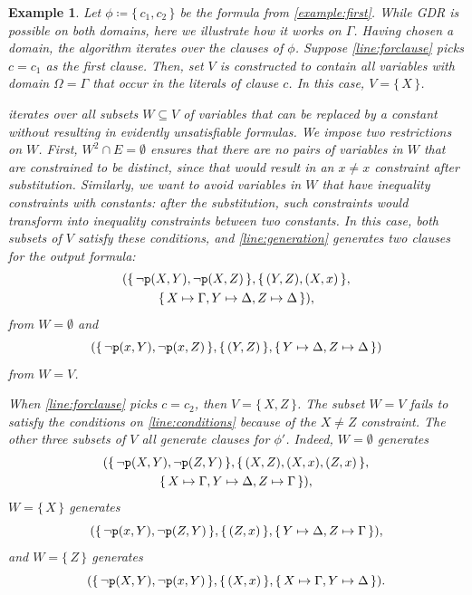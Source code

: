 \documentclass{article}
\newtheorem{example}{Example}
\newcommand{\predicate}{\texttt{\textup{p}}}
\begin{document}
\begin{example}
  Let $\phi \coloneqq \{\, c_1, c_2 \,\}$ be the formula from
  \cref{example:first}. While GDR is possible on both domains, here we
  illustrate how it works on $\Gamma$. Having chosen a domain, the algorithm
  iterates over the clauses of $\phi$. Suppose \cref{line:forclause} picks
  $c = c_1$ as the first clause. Then, set $V$ is constructed to contain all
  variables with domain $\Omega = \Gamma$ that occur in the literals of clause
  $c$. In this case, $V = \{\, X \,\}$.

   iterates over all subsets $W \subseteq V$ of variables
  that can be replaced by a constant without resulting in evidently
  unsatisfiable formulas. We impose two restrictions on $W$. First,
  $W^2 \cap E = \emptyset$ ensures that there are no pairs of variables in $W$
  that are constrained to be distinct, since that would result in an $x \ne x$
  constraint after substitution. Similarly, we want to avoid variables in $W$
  that have inequality constraints with constants: after the substitution, such
  constraints would transform into inequality constraints between two constants.
  In this case, both subsets of $V$ satisfy these conditions, and
  \cref{line:generation} generates two clauses for the output formula:
  \begin{multline*}
    (\{\, \neg \predicate(X, Y), \neg \predicate(X, Z) \,\}, \{\, (Y, Z), (X, x) \,\}, \\
    \{\, X \mapsto \Gamma, Y \mapsto \Delta, Z \mapsto \Delta \,\}),
  \end{multline*}
  from $W = \emptyset$ and
  \[
    (\{\, \neg \predicate(x, Y), \neg \predicate(x, Z) \,\}, \{\, (Y, Z) \,\}, \{\, Y \mapsto \Delta, Z \mapsto \Delta \,\})
  \]
  from $W = V$.

  When \cref{line:forclause} picks $c = c_2$, then $V = \{\, X, Z \,\}$. The
  subset $W = V$ fails to satisfy the conditions on \cref{line:conditions}
  because of the $X \ne Z$ constraint. The other three subsets of $V$ all
  generate clauses for $\phi'$. Indeed, $W = \emptyset$ generates
  \begin{multline*}
    (\{\, \neg \predicate(X, Y), \neg \predicate(Z, Y) \,\}, \{\, (X, Z), (X, x), (Z, x) \,\}, \\
    \{\, X \mapsto \Gamma, Y \mapsto \Delta, Z \mapsto \Gamma \,\}),
  \end{multline*}
  $W = \{\, X \,\}$ generates
  \[
    (\{\, \neg \predicate(x, Y), \neg \predicate(Z, Y) \,\}, \{\, (Z, x) \,\}, \{\, Y \mapsto \Delta, Z \mapsto \Gamma \,\}),
  \]
  and $W = \{\, Z \,\}$ generates
  \[
    (\{\, \neg \predicate(X, Y), \neg \predicate(x, Y) \,\}, \{\, (X, x) \,\}, \{\, X \mapsto \Gamma, Y \mapsto \Delta \,\}).
  \]
\end{example}
\end{document}
